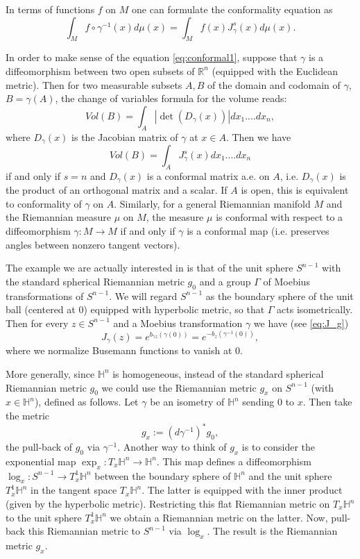 \documentclass[12pt]{amsbook}%
\theoremstyle{definition}
\theoremstyle{remark}
\numberwithin{section}{chapter}
\numberwithin{subsection}{section}
\numberwithin{figure}{chapter}
\def\bH{{\mathbb{H}}}
\def\Ga{\Gamma}
\def\ga{\gamma}
\begin{document}
{{In terms of functions $f$ on $M$ one can formulate the conformality equation as
$$
\int_M f\circ \ga^{-1}(x)d\mu(x)= \int_M f(x)J^s_\ga(x)d\mu(x). 
$$  

In order to make sense of the equation \eqref{eq:conformal1}, suppose that $\ga$ is a  diffeomorphism between two open subsets of $\mathbb R^n$ (equipped with the Euclidean metric). Then for two measurable subsets $A, B$ of the domain and codomain of $\ga$, $B=\gamma(A)$, the change of variables formula for the volume reads:
$$
Vol(B)=\int_A |\det(D_\ga(x))|dx_1....dx_n,
$$
where $D_\ga(x)$ is the Jacobian matrix of $\ga$ at $x\in A$. Then  we have 
$$
Vol(B)=\int_A J^s_\ga(x)dx_1....dx_n 
$$
if and only if $s=n$ and $D_\ga(x)$ is a conformal matrix a.e. on $A$, i.e. $D_\ga(x)$ is the product of an orthogonal matrix and a scalar. If $A$ is open, this is equivalent to conformality of $\ga$ on $A$. Similarly, for a general Riemannian manifold $M$ and the Riemannian measure $\mu$ on $M$, the measure $\mu$ is conformal with respect to a diffeomorphism $\ga: M\to M$ if and only if $\ga$ is a conformal map (i.e. preserves angles between nonzero tangent vectors). 


The example we are actually interested in is that of the unit sphere $S^{n-1}$ with the standard spherical Riemannian metric $g_0$ and a group $\Ga$ of Moebius transformations of $S^{n-1}$. We will regard $S^{n-1}$ as the boundary sphere of the unit ball (centered at $0$) equipped with hyperbolic metric, so that $\Ga$ acts isometrically. Then for every $z\in S^{n-1}$ and a Moebius transformation $\ga$ we have (see \eqref{eq:J_g})
\begin{equation}\label{eq:J_g1}
J_\ga(z)= e^{b_{\ga z}(\ga(0))}=e^{-b_z(\ga^{-1}(0))}, 
\end{equation}
where we normalize Busemann functions to vanish at $0$. 

More generally, since $\bH^n$ is homogeneous, instead of the standard spherical Riemannian metric $g_0$ we could use the Riemannian metric 
$g_x$ on $S^{n-1}$  (with $x\in \bH^n$), defined as follows. Let $\ga$ be an isometry of $\bH^n$ sending $0$ to $x$. Then take the metric 
$$
g_x:= (d\ga^{-1})^* g_0,
$$
the pull-back of $g_0$ via $\ga^{-1}$. Another way to think of $g_x$ is to consider the exponential map $\exp_x: T_x\bH^n\to \bH^n$. 
This map defines a diffeomorphism $\log_x: S^{n-1}\to T^1_x\bH^n$ between the boundary sphere of $\bH^n$ and the unit sphere $T^1_x\bH^n$ in the tangent space $T_x\bH^n$. The latter is equipped with the inner product (given by the hyperbolic metric). Restricting this flat Riemannian metric on $T_x\bH^n$ to the unit sphere $T^1_x\bH^n$ we obtain a Riemannian metric on the latter. Now, pull-back this Riemannian metric to $S^{n-1}$ via $\log_x$. The result is the Riemannian metric $g_x$. 


}}
\end{document}

